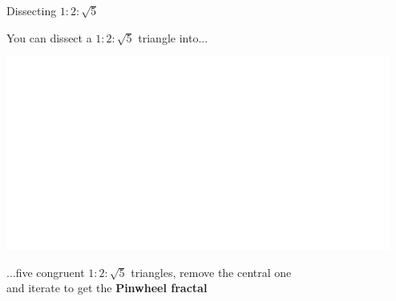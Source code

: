 \documentclass[14pt]{beamer}
\begin{document}

    \begin{frame}{Dissecting $1\!\!:\!\!2\!\!:\!\!\sqrt{5}$}
        \begin{center}
            You can dissect a $1\!\!:\!\!2\!\!:\!\!\sqrt{5}$ triangle into...

            \bigskip \bigskip

            \includegraphics[height=18ex]{figures/figure006h.pdf}

            \bigskip \bigskip

            ...five congruent $1\!\!:\!\!2\!\!:\!\!\sqrt{5}$ triangles, remove the central one\\and iterate to get the \textbf{Pinwheel fractal}
        \end{center}
    \end{frame}

\end{document}

